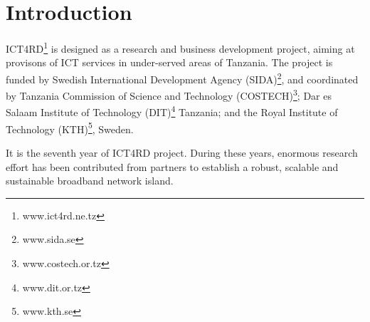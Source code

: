 \chapter{Introduction}
ICT4RD\footnote{www.ict4rd.ne.tz} is designed as a research and business development project, aiming at provisons of ICT services in under-served areas of Tanzania. The project is funded by Swedish International Development Agency (SIDA)\footnote{www.sida.se}, and coordinated by Tanzania Commission of Science and Technology (COSTECH)\footnote{www.costech.or.tz}; Dar es Salaam Institute of Technology (DIT)\footnote{www.dit.or.tz} Tanzania; and the Royal Institute of Technology (KTH)\footnote{www.kth.se}, Sweden.

It is the seventh year of ICT4RD project. During these years, enormous research effort has been contributed from partners to establish a robust, scalable and sustainable broadband network island. 